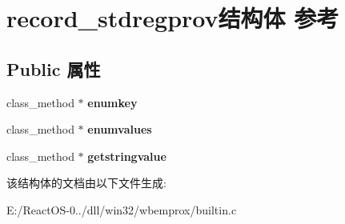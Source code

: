 \hypertarget{structrecord__stdregprov}{}\section{record\+\_\+stdregprov结构体 参考}
\label{structrecord__stdregprov}
\subsection*{Public 属性}
\begin{DoxyCompactItemize}
\item 
\mbox{\label{structrecord__stdregprov_a52097231c5abcd6dee9e18a9fcceaf80}} 
class\+\_\+method $\ast$ {\bfseries enumkey}
\item 
\mbox{\label{structrecord__stdregprov_a6ce468598e05693e4fc0e81dd91c89bd}} 
class\+\_\+method $\ast$ {\bfseries enumvalues}
\item 
\mbox{\label{structrecord__stdregprov_a7b102243ca7c650270e2d7c79f9a474c}} 
class\+\_\+method $\ast$ {\bfseries getstringvalue}
\end{DoxyCompactItemize}


该结构体的文档由以下文件生成\+:\begin{DoxyCompactItemize}
\item 
E\+:/\+React\+O\+S-\/0../dll/win32/wbemprox/builtin.\+c\end{DoxyCompactItemize}
